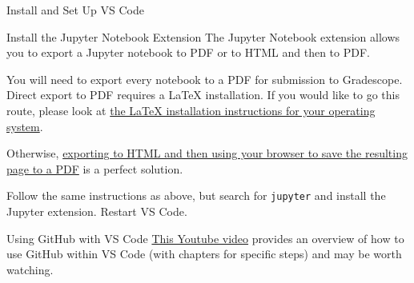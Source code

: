 \documentclass[
  ignorenonframetext,
  aspectratio=169,
]{beamer}
\begin{document}
\begin{frame}[fragile]{Install and Set Up VS Code}
\begin{block}{Install the Jupyter Notebook Extension}
\protect{}\label{install-the-jupyter-notebook-extension}
The Jupyter Notebook extension allows you to export a Jupyter notebook
to PDF or to HTML and then to PDF.

\begin{tcolorbox}[enhanced jigsaw, arc=.35mm, bottomrule=.15mm, bottomtitle=1mm, breakable, colback=white, colbacktitle=quarto-callout-tip-color!10!white, colframe=quarto-callout-tip-color-frame, coltitle=black, left=2mm, leftrule=.75mm, opacityback=0, opacitybacktitle=0.6, rightrule=.15mm, title=\textcolor{quarto-callout-tip-color}{\faLightbulb}\hspace{0.5em}{PDF Export for Gradescope}, titlerule=0mm, toprule=.15mm, toptitle=1mm]

You will need to export every notebook to a PDF for submission to
Gradescope. Direct export to PDF requires a LaTeX installation. If you
would like to go this route, please look at
\href{https://www.latex-project.org/get/}{the LaTeX installation
instructions for your operating system}.

Otherwise, \href{homework.qmd}{exporting to HTML and then using your
browser to save the resulting page to a PDF} is a perfect solution.

\end{tcolorbox}

Follow the same instructions as above, but search for \texttt{jupyter}
and install the Jupyter extension. Restart VS Code.
\end{block}
\end{frame}

\begin{frame}{Using GitHub with VS Code}
\protect{}\label{using-github-with-vs-code}
\href{https://youtu.be/z5jZ9lrSpqk?t=115&si=PcpNxjmF1ByTUdJq}{This
Youtube video} provides an overview of how to use GitHub within VS Code
(with chapters for specific steps) and may be worth watching.
\end{frame}
\end{document}
